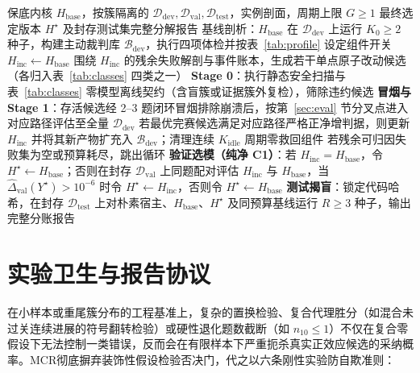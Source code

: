 \documentclass[UTF8,a4paper,10.5pt]{ctexart}
\newcommand{\method}{MCR}
\newcommand{\Ddev}{\mathcal{D}_{\mathrm{dev}}}
\newcommand{\Dval}{\mathcal{D}_{\mathrm{val}}}
\newcommand{\Dtest}{\mathcal{D}_{\mathrm{test}}}
\newcommand{\Bdev}{\mathcal{B}_{\mathrm{dev}}}
\begin{document}
\begin{algorithm}[t]
\caption{\method{} 搜索前体检、自适应外层周期与 C1 留出协议}
\label{alg:mcr}
\begin{algorithmic}[1]
\Require 保底内核 $H_{\mathrm{base}}$，按簇隔离的 $\Ddev,\Dval,\Dtest$，实例剖面，周期上限 $G\ge 1$
\Ensure 最终选定版本 $H^\star$ 及封存测试集完整分解报告
\State 基线剖析：$H_{\mathrm{base}}$ 在 $\Ddev$ 上运行 $K_0\ge 2$ 种子，构建主动裁判库 $\Bdev$，执行四项体检并按表~\ref{tab:profile} 设定组件开关
\State $H_{\mathrm{inc}}\gets H_{\mathrm{base}}$
 
  \State 围绕 $H_{\mathrm{inc}}$ 的残余失败解剖与事件账本，生成若干单点原子改动候选（各归入表~\ref{tab:classes} 四类之一）
  \State \textbf{Stage 0}：执行静态安全扫描与表~\ref{tab:classes} 零模型离线契约（含盲簇或证据簇外复检），筛除违约候选
  \State \textbf{冒烟与 Stage 1}：存活候选经 2--3 题闭环冒烟排除崩溃后，按第~\ref{sec:eval} 节分叉点进入对应路径评估至全量 $\Ddev$
  \State 若最优完赛候选满足对应路径严格正净增判据，则更新 $H_{\mathrm{inc}}$ 并将其新产物扩充入 $\Bdev$；清理连续 $K_{\mathrm{idle}}$ 周期零救回组件
  \State 若残余可归因失败集为空或预算耗尽，跳出循环
\EndFor
\State \textbf{验证选模（纯净 C1）}：若 $H_{\mathrm{inc}}=H_{\mathrm{base}}$，令 $H^\star\gets H_{\mathrm{base}}$；否则在封存 $\Dval$ 上同题配对评估 $H_{\mathrm{inc}}$ 与 $H_{\mathrm{base}}$，当 $\hat{\Delta}_{\mathrm{val}}(Y^\star)>10^{-6}$ 时令 $H^\star\gets H_{\mathrm{inc}}$，否则令 $H^\star\gets H_{\mathrm{base}}$
\State \textbf{测试揭盲}：锁定代码哈希，在封存 $\Dtest$ 上对朴素宿主、$H_{\mathrm{base}}$、$H^\star$ 及同预算基线运行 $R\ge 3$ 种子，输出完整分账报告
\end{algorithmic}
\end{algorithm}

\section{实验卫生与报告协议}
\label{sec:protocol}

在小样本或重尾簇分布的工程基准上，复杂的置换检验、复合代理胜分（如混合未过关连续进展的符号翻转检验）或硬性退化题数截断（如 $n_{10}\le 1$）不仅在复合零假设下无法控制一类错误，反而会在有限样本下严重扼杀真实正效应候选的采纳概率。\method{}彻底摒弃装饰性假设检验否决门，代之以六条刚性实验防自欺准则：
\end{document}
